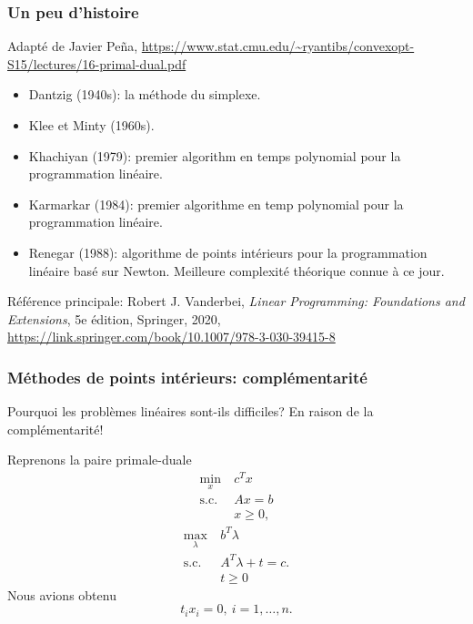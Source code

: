\documentclass[t,usepdftitle=false]{beamer}
\begin{document}
\begin{frame}
\frametitle{Un peu d'histoire}

Adapté de Javier Peña, \url{https://www.stat.cmu.edu/~ryantibs/convexopt-S15/lectures/16-primal-dual.pdf}
\begin{itemize}
\item 
Dantzig (1940s): la méthode du simplexe.
\item
Klee et Minty (1960s).
\item 
Khachiyan (1979): premier algorithm en temps polynomial pour la programmation linéaire.
\item
Karmarkar (1984): premier algorithme en temp polynomial pour la programmation linéaire.
\item 
Renegar (1988): algorithme de points intérieurs pour la programmation linéaire basé sur Newton. Meilleure complexité théorique connue à ce jour.
\end{itemize}

Référence principale: Robert J. Vanderbei, \textit{Linear
Programming: Foundations and Extensions}, 5e édition, Springer, 2020, \url{https://link.springer.com/book/10.1007/978-3-030-39415-8}

\end{frame}

\begin{frame}
\frametitle{Méthodes de points intérieurs: complémentarité}

Pourquoi les problèmes linéaires sont-ils difficiles? En raison de la complémentarité!

\mbox{}

Reprenons la paire primale-duale
\begin{align*}
\min_x\ & c^T x \\
\mbox{s.c. } & Ax = b \\
& x \geq 0,
\end{align*}
\begin{align*}
\max_{\lambda} \  & b^T \lambda \\
\mbox{s.c. } & A^T \lambda  +t = c. \\
& t \geq 0
\end{align*}
Nous avions obtenu
\[
t_i x_i = 0, \ i = 1,\ldots, n.
\]

\end{frame}
\end{document}
